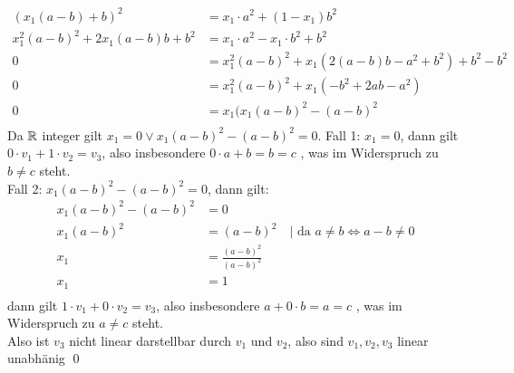 \documentclass{gadsescript}
\begin{document}
\begin{enumerate}[label=(\roman*)]
\begin{proof*}
\begin{description}
\begin{align*}
						(x_1 ( a - b ) + b)^2 &= x_1 \cdot a^2 + (1 - x_1)b^2\\
						x_1^2 ( a - b ) ^2 + 2 x_1(a-b)b + b^2 &= x_1 \cdot a^2 - x_1 \cdot b^2 + b^2 \\
						0 &= x_1^2 (a - b)^2 + x_1( 2(a-b)b - a^2 + b^2) + b^2 - b^2  \\
						0 &= x_1^2 (a - b)^2 + x_1(- b^2 + 2ab - a^2) \\
						0 &= x_1 ( x_1(a - b)^2 - (a - b)^2 \\
					\end{align*}
					Da $ \mathbb{R}  $ integer gilt $ x_1 = 0 \vee x_1(a-b)^2 - (a - b)^2 = 0 $.
					Fall 1: $ x_1 = 0 $, dann gilt $ 0 \cdot v_1 + 1 \cdot v_2 = v_3 $, also insbesondere $ 0 \cdot a + b = b = c $ \Lightning, was im Widerspruch zu $ b \neq c $ steht.\\
					Fall 2: $ x_1(a-b)^2 - (a-b)^2 = 0 $, dann gilt:
					\begin{align*}
						x_1(a-b)^2 - (a - b)^2 &= 0 \\
						x_1(a-b)^2 &= (a-b)^2 \quad | \text{ da } a \neq b \iff a-b \neq 0\\
						x_1 &= \frac{(a-b)^2}{ (a-b)^2 }  \\
						x_1 &= 1 \\
					\end{align*}
					dann gilt $ 1 \cdot v_1 + 0 \cdot v_2 = v_3 $, also insbesondere $ a + 0 \cdot b = a = c $ \Lightning, was im Widerspruch zu $ a \neq c $ steht.\\
					Also ist $ v_3  $ nicht linear darstellbar durch $ v_1 $ und $ v_2 $, also sind $ v_1, v_2, v_3 $ linear unabhänig \qed
			\end{description}
			
		\end{proof*}
		
		

	\end{enumerate}
\end{document}
